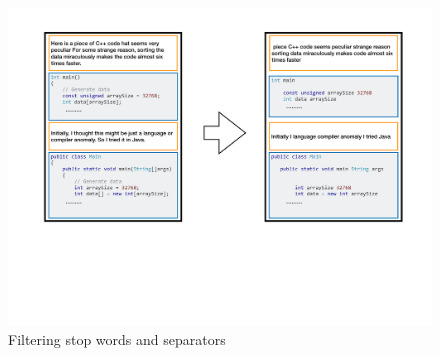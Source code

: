 \documentclass[12pt,mscthesis]{usiinfthesis}
\begin{document}
	\begin{figure}[htbp]
	\centering
	\includegraphics[width=\textwidth]{FilterLM}
	\caption{Filtering stop words and separators}
	\label{FilterLM}
	\end{figure}
\end{document}
